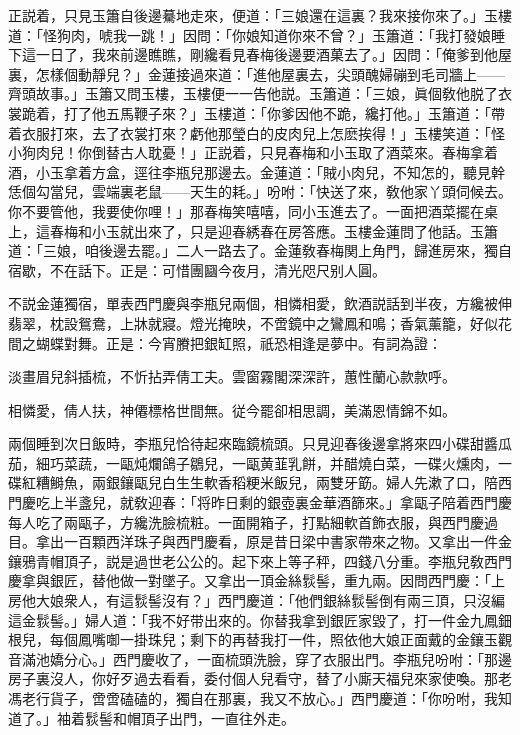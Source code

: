 正説着，只見玉簫自後邊驀地走來，便道：「三娘還在這裏？我來接你來了。」玉樓道：「怪狗肉，唬我一跳！」因問：「你娘知道你來不曾？」玉簫道：「我打發娘睡下這一日了，我來前邊瞧瞧，剛纔看見春梅後邊要酒菓去了。」因問：「俺爹到他屋裏，怎樣個動靜兒？」金蓮接過來道：「進他屋裏去，尖頭醜婦磞到毛司牆上——齊頭故事。」玉簫又問玉樓，玉樓便一一告他説。玉簫道：「三娘，眞個敎他脱了衣裳跪着，打了他五馬鞭子來？」玉樓道：「你爹因他不跪，纔打他。」玉簫道：「帶着衣服打來，去了衣裳打來？虧他那瑩白的皮肉兒上怎麽挨得！」玉樓笑道：「怪小狗肉兒！你倒替古人耽憂！」正説着，只見春梅和小玉取了酒菜來。春梅拿着酒，小玉拿着方盒，逕往李瓶兒那邊去。金蓮道：「賊小肉兒，不知怎的，聽見幹恁個勾當兒，雲端裏老鼠——天生的耗。」吩咐：「快送了來，敎他家丫頭伺候去。你不要管他，我要使你哩！」那春梅笑嘻嘻，同小玉進去了。一面把酒菜擺在桌上，這春梅和小玉就出來了，只是迎春綉春在房答應。玉樓金蓮問了他話。玉簫道：「三娘，咱後邊去罷。」二人一路去了。金蓮敎春梅関上角門，歸進房來，獨自宿歇，不在話下。正是：可惜團圝今夜月，清光咫尺别人圓。

不説金蓮獨宿，單表西門慶與李瓶兒兩個，相憐相愛，飲酒説話到半夜，方纔被伸翡翠，枕設鴛鴦，上牀就寢。燈光掩映，不啻鏡中之鸞鳳和鳴；香氣薰籠，好似花間之蝴蝶對舞。正是：今宵賸把銀缸照，祇恐相逢是夢中。有詞為證：

\begin{myquote}
淡畫眉兒斜插梳，不忻拈弄倩工夫。雲窗霧閣深深許，蕙性蘭心款款呼。

相憐愛，倩人扶，神僊標格世間無。従今罷卻相思調，美滿恩情錦不如。
\end{myquote}

兩個睡到次日飯時，李瓶兒恰待起來臨鏡梳頭。只見迎春後邊拿將來四小碟甜醬瓜茄，細巧菜蔬，一甌炖爛鴿子鶵兒，一甌黄韮乳餅，并醋燒白菜，一碟火燻肉，一碟紅糟鰣魚，兩銀鑲甌兒白生生軟香稻粳米飯兒，兩雙牙筯。婦人先漱了口，陪西門慶吃上半盞兒，就敎迎春：「将昨日剩的銀壺裏金華酒篩來。」拿甌子陪着西門慶每人吃了兩甌子，方纔洗臉梳粧。一面開箱子，打點細軟首飾衣服，與西門慶過目。拿出一百顆西洋珠子與西門慶看，原是昔日梁中書家帶來之物。又拿出一件金鑲鴉青帽頂子，説是過世老公公的。起下來上等子秤，四錢八分重。李瓶兒敎西門慶拿與銀匠，替他做一對墜子。又拿出一頂金絲䯼髻，重九兩。因問西門慶：「上房他大娘衆人，有這䯼髻沒有？」西門慶道：「他們銀絲䯼髻倒有兩三頂，只沒編這金䯼髻。」婦人道：「我不好带出來的。你替我拿到銀匠家毀了，打一件金九鳳鈿根兒，每個鳳嘴啣一掛珠兒；剩下的再替我打一件，照依他大娘正面戴的金鑲玉觀音滿池嬌分心。」西門慶收了，一面梳頭洗臉，穿了衣服出門。李瓶兒吩咐：「那邊房子裏沒人，你好歹過去看看，委付個人兒看守，替了小廝天福兒來家使喚。那老馮老行貨子，啻啻磕磕的，獨自在那裏，我又不放心。」西門慶道：「你吩咐，我知道了。」袖着䯼髻和帽頂子出門，一直往外走。

